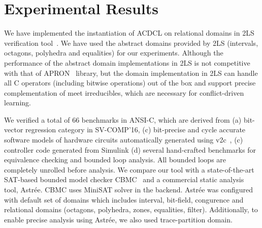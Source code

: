 \section{Experimental Results}
We have implemented the instantiation of ACDCL on relational domains
in 2LS verification tool~\cite{2ls}.  We have used the abstract domains
provided by 2LS (intervals, octagons, polyhedra and equalities) for our
experiments. Although the performance of the abstract domain implementations 
in 2LS is not competitive with that of APRON~\cite{apron} library, but 
the domain implementation in 2LS can handle all C operators 
(including bitwise operations) out of the box and support precise
complementation of meet irreducibles, which are necessary for conflict-driven 
learning. 

We verified a total of 66 benchmarks in ANSI-C, which are derived from 
(a) bit-vector regression category in SV-COMP'16, (c) bit-precise and 
cycle accurate software models of hardware circuits automatically 
generated using v2c~\cite{mtk2016}, (c) controller code generated 
from Simulink (d) several hand-crafted benchmarks for equivalence 
checking and bounded loop analysis.  All bounded loops are completely 
unrolled before analysis.  We compare our tool with a state-of-the-art 
SAT-based bounded model checker CBMC~\cite{cbmc} and a commercial 
static analysis tool, Astr{\'e}e.  CBMC uses MiniSAT solver in the backend.  
Astr{\'e}e was configured with default set of domains which includes 
interval, bit-field, congurence and relational domains (octagons, polyhedra, 
zones, equalities, filter).  Additionally, to enable precise analysis 
using Astr{\'e}e, we also used trace-partition domain.   

